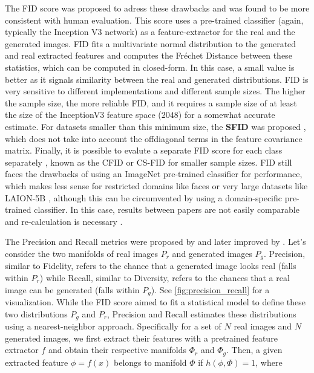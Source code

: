 The \ac{FID} score \citep{heusel2017gans} was proposed to adress these drawbacks and 
was found to be more consistent with human evaluation. This score uses a pre-trained 
classifier (again, typically the Inception V3 network) as a feature-extractor for the 
real and the generated images.  \ac{FID}
fits a multivariate normal distribution to the generated and real extracted features and 
computes the Fréchet Distance between these statistics, which can be computed in closed-form.
In this case, a small value is better as it signals similarity between the real and generated 
distributions. \ac{FID} is very sensitive to different implementations and different sample sizes. 
The higher the sample size, the more reliable \ac{FID}, and it requires a sample size of at least 
the size of the InceptionV3 feature space ($2048$) for a somewhat accurate estimate. 
For datasets smaller than this minimum size, the \textbf{\ac{SFID}} was proposed 
\citep{kim2020simplified}, which does
 not take into account the offdiagonal terms in the feature covariance matrix. Finally, it is 
 possible to evalute a separate FID score for each class separately \citep{benny2021evaluation}, known as the 
 \ac{CFID} or \ac{CS-FID} for smaller sample sizes.
\ac{FID}
still faces the drawbacks of using an ImageNet pre-trained classifier for performance, which 
 makes less sense for restricted domains like faces or very large datasets like LAION-5B \citep{schuhmann2022laion}, 
 although this can be circumvented by using 
a domain-specific pre-trained classifier. In this case, results between papers are not easily 
comparable and re-calculation is necessary \citep{dhariwal2021diffusion}. 

  The Precision and Recall metrics were proposed by \cite{sajjadi2018assessing} and 
later improved by \cite{kynkaanniemi2019improved}. Let's consider the two manifolds of real images $P_r$ and 
generated images $P_g$.
Precision, similar to Fidelity, refers to the chance that a generated image looks real (falls within $P_r$) while 
Recall, similar to Diversity, refers to the chances that a real image can be generated (falls within $P_g$).
See \ref{fig:precision_recall} for a visualization. While the \ac{FID} score aimed to fit a statistical model 
to define these two distributions $P_g$ and $P_r$, Precision and Recall estimates these distributions 
using a nearest-neighbor approach. Specifically for a set of $N$ real images
and $N$ generated images, we first extract their features with a pretrained
feature extractor $f$ and obtain their respective manifolds $\Phi_r$ and $\Phi_g$. 
Then, a given extracted feature $\phi = f(x)$ belongs to manifold $\Phi$ if $h(\phi, \Phi) = 1$, where 

